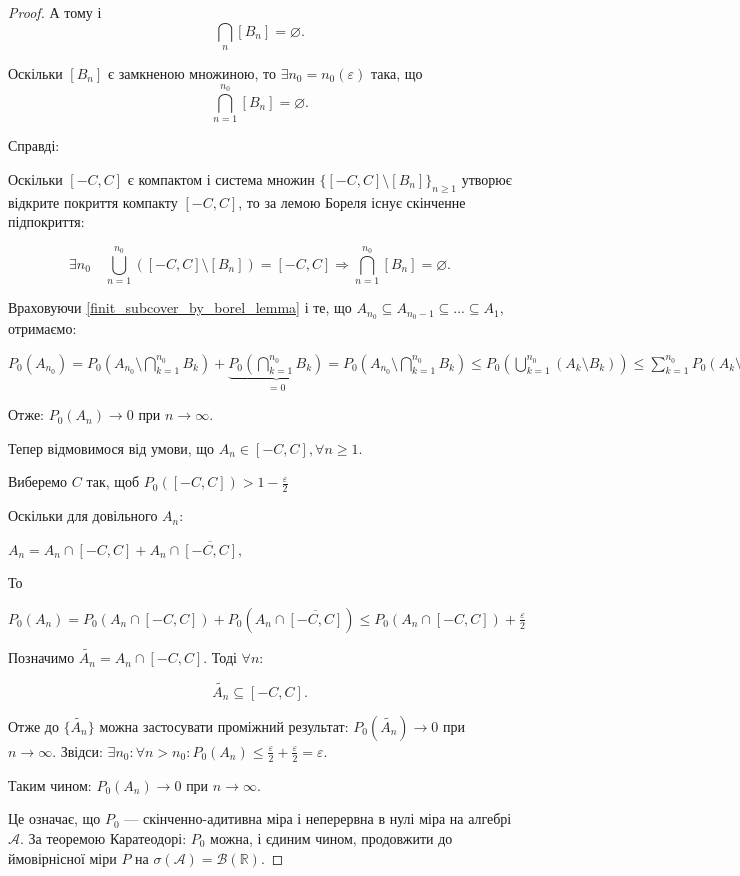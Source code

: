 \begin{proof}
    А тому і 
    $$\bigcap\limits_{n} [B_n] = \varnothing.$$
    
    Оскільки $[B_n]$ є замкненою множиною, то $\exists n_0 = n_0(\varepsilon)$
    така, що 
    $$\bigcap\limits_{n=1}^{n_0} [B_n] = \varnothing.$$
    
    Справді: 
    
    Оскільки $[-C, C]$ є компактом і система множин $\{[-C, C] \setminus [B_n]\}_{n \geqslant 1}$ 
    утворює відкрите покриття
    компакту $[-C, C]$, то за лемою Бореля існує скінченне підпокриття:
    
    \begin{equation}
        \label{finit_subcover_by_borel_lemma}
        \exists n_0 \quad \bigcup\limits_{n=1}^{n_0} ([-C, C] \setminus [B_n])
        = [-C, C] \Rightarrow \bigcap\limits_{n=1}^{n_0} [B_n] = \varnothing.
    \end{equation}
    
    Враховуючи \ref{finit_subcover_by_borel_lemma} і те, що
    $A_{n_0} \subseteq A_{n_0 - 1} \subseteq ... \subseteq A_{1}$,
    отримаємо:
    
    $P_0(A_{n_0})
    = P_0(A_{n_0} \setminus \bigcap\limits_{k=1}^{n_0} B_k) + \underbrace{P_0(\bigcap\limits_{k=1}^{n_0} B_k)}_{= 0}
    = P_0(A_{n_0} \setminus \bigcap\limits_{k=1}^{n_0} B_k)
    \leqslant P_0(\bigcup\limits_{k=1}^{n_0} (A_{k} \setminus B_k))
    \leqslant \sum\limits_{k=1}^{n_0} P_0(A_{k} \setminus B_k)
    \leqslant \sum\limits_{k=1}^{n_0} \frac{\varepsilon}{2^k}
    \leqslant \varepsilon$
    
    Отже: $P_0(A_n) \rightarrow 0$ при $n \rightarrow \infty$.
    
    
    Тепер відмовимося від умови, що $A_n \in [-C, C], \forall n \geqslant 1$.
    
    Виберемо $C$ так, щоб $P_0([-C, C]) > 1 - \frac{\varepsilon}{2}$
    
    Оскільки для довільного $A_n$:
    
    $A_n = A_n \cap [-C, C] + A_n \cap \overline{[-C, C]},$
    
    То 
    
    $P_0(A_n) = P_0(A_n \cap [-C, C]) + P_0(A_n \cap \overline{[-C, C]})
    \leqslant P_0(A_n \cap [-C, C]) + \frac{\varepsilon}{2}$
    
    Позначимо $\widetilde{A_n} = A_n \cap [-C, C]$. Тоді $\forall n$: 
    
    $$\widetilde{A_n} \subseteq [-C, C].$$
    
    Отже до $\{\widetilde{A_n}\}$ можна застосувати проміжний результат:
    $P_0(\widetilde{A_n}) \rightarrow 0$ при $n \rightarrow \infty$. Звідси:
    $\exists n_0: \forall n > n_0: P_0(A_n) \leqslant \frac{\varepsilon}{2} + \frac{\varepsilon}{2} = \varepsilon.$
    
    Таким чином: $P_0(A_n) \rightarrow 0$ при $n \rightarrow \infty$.
    
    Це означає, що $P_0$ --- скінченно-адитивна міра і неперервна в нулі 
    міра на алгебрі $\mathcal{A}$. 
    За теоремою Каратеодорі: $P_0$
    можна, і єдиним чином, продовжити до ймовірнісної міри $P$ на
    $\sigma(\mathcal{A}) = \mathcal{B}(\mathbb{R})$.
\end{proof}


